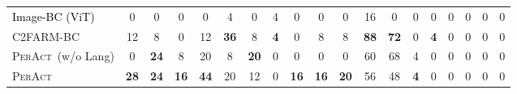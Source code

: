 \documentclass{article}
\newcommand{\bczvit}{Image-BC (ViT)~}
\newcommand{\unet}{C2FARM-BC~}
\newcommand{\highlight}[1]{\textcolor{black}{#1}}
\newcommand{\model}{\textsc{PerAct}}
\begin{document}
\begin{table}[!t]
\begin{tabular}{lcccccccccccccccccc}
\highlight{\bczvit}   & 0                    & 0                                                  & 0                    & 0                                                  & 4                    & 0                                                       & 4                    & 0                                                     & 0                    & 0                                                & 16                   & 0                                                    & 0                    & 0                                                & 0                    & 0                                                 & 0                    & 0                                                   \\
\unet             & 12                   & 8                                                      & 0                    & 12                                                           & \textbf{36}          & 8                                                        & \textbf{4}           & 0                                                          & 8           & 8                                                & \textbf{88}          & \textbf{72}                                              & 0                    & \textbf{4}                                                       & 0                    & 0                                                     & 0                    & 0                                                   \\
\model~(w/o Lang) & 0                    & \textbf{24}                                            & 8                    & 20                                                           & 8                    & \textbf{20}                                                       & 0                    & 0                                                          & 0                    & 0                                                & 60                   & 68                                                       & 4                    & 0                                                       & 0                    & 0                                                     & 0                    & 0                                                   \\
\rowcolor[rgb]{0.9,1.0,0.9}\model~ & \textbf{28}          & \textbf{24}                                            & \textbf{16}          & \textbf{44}                                                  & 20                   & 12                                                       & 0                    & \textbf{16}                                                & \textbf{16}          & \textbf{20}                                      & 56                   & 48                                                       & \textbf{4}           & 0                                                       & 0                    & 0                                                     & 0                    & 0                                                   \\[-1pt]

\end{tabular}
\end{table}
\end{document}
